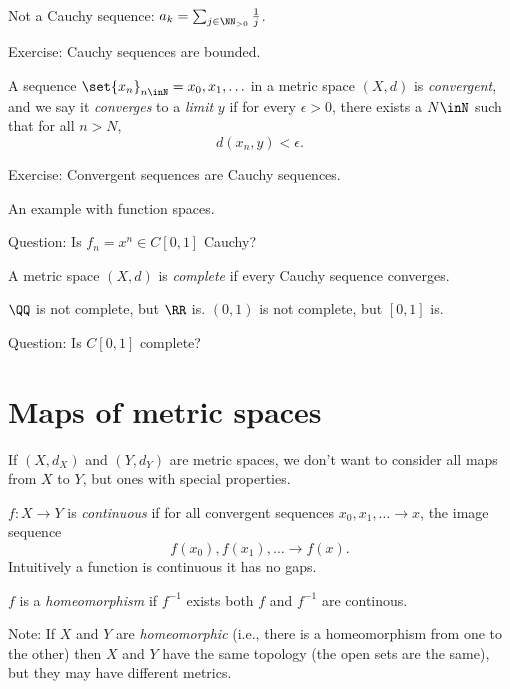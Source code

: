 \documentclass{article}
\begin{document}
Not a Cauchy sequence: $a_k = \sum_{j\in\NN_{>0}} \frac{1}{j}$.

Exercise: Cauchy sequences are bounded.

\begin{definition}
    A sequence $\set{x_n}_{n\inN}=x_0,x_1,\ldots$ 
    in a metric space $(X,d)$ is \emph{convergent},
    and we say it \emph{converges} to a \emph{limit} $y$
    if for every $\epsilon > 0$, there exists a $N\inN$ such 
    that for all $n > N$, 
    \[ d(x_n,y) < \epsilon. \]
\end{definition}

Exercise: Convergent sequences are Cauchy sequences.

An example with function spaces. 

Question: Is $f_n=x^n \in C[0,1]$ Cauchy?

\begin{definition}
    A metric space $(X,d)$ is \emph{complete} if every Cauchy sequence converges.
\end{definition}

\begin{example}
    $\QQ$ is not complete, but $\RR$ is.
    $(0,1)$ is not complete, but $[0,1]$ is.
\end{example}

Question: Is $C[0,1]$ complete?

\section{Maps of metric spaces}

If $(X,d_X)$ and $(Y,d_Y)$ are metric spaces, we don't want
to consider all maps from $X$ to $Y$, but ones with special
properties.

\begin{definition}
    $f:X\to Y$ is \emph{continuous} if for all convergent
    sequences $x_0,x_1,\ldots \to x$, the image sequence
    \[ f(x_0),f(x_1),\ldots \to f(x). \]
    Intuitively a function is continuous it has no gaps.
\end{definition}

\begin{definition}
    $f$ is a \emph{homeomorphism} if $f^{-1}$ exists 
    both $f$ and $f^{-1}$ are continous.
\end{definition}

Note: If $X$ and $Y$ are \emph{homeomorphic}
(i.e., there is a homeomorphism from one to the other)
then $X$ and $Y$ have the same topology 
(the open sets are the same), but they may have different metrics.
\end{document}
